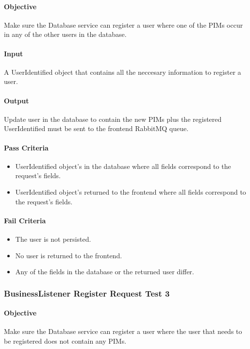 \documentclass[hidelinks,english]{article}
\begin{document}
				\paragraph{Objective} Make sure the Database service can register a user where one of the PIMs occur in any of the other users in the database.
				\paragraph{Input} A UserIdentified object that contains all the neccesary information to register a user.
				\paragraph{Output} Update user in the database to contain the new PIMs plus the registered UserIdentified must be sent to the frontend RabbitMQ queue.
				\paragraph{Pass Criteria}
				\begin{itemize}
					\item UserIdentified object's in the database where all fields correspond to the request's fields.
					\item UserIdentified object's returned to the frontend where all fields correspond to the request's fields.
				\end{itemize}
				\paragraph{Fail Criteria}
				\begin{itemize}
					\item The user is not persisted.
					\item No user is returned to the frontend.
					\item Any of the fields in the database or the returned user differ.
				\end{itemize}
				
			\subsubsection{BusinessListener Register Request Test 3}\label{databasebusinesslistenerregistertest3}
				\paragraph{Objective} Make sure the Database service can register a user where the user that needs to be registered does not contain any PIMs.
\end{document}
